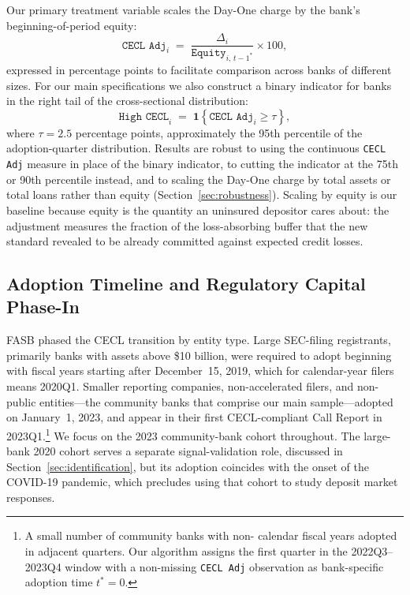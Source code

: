 Our primary treatment variable scales the Day-One charge by the bank's
beginning-of-period equity:
\begin{equation}
  \texttt{CECL Adj}_{i}
  \;=\;
  \frac{\Delta_i}{\texttt{Equity}_{i,\,t-1^{*}}}
  \times 100,
  \label{eq:treatment}
\end{equation}
expressed in percentage points to facilitate comparison across banks of
different sizes.  For our main specifications we also construct a binary
indicator for banks in the right tail of the cross-sectional distribution:
\begin{equation}
  \texttt{High CECL}_{i}
  \;=\;
  \mathbf{1}\!\left\{
    \texttt{CECL Adj}_{i} \geq \tau
  \right\},
  \label{eq:binary}
\end{equation}
where $\tau = 2.5$ percentage points, approximately the 95th percentile of the
adoption-quarter distribution.  Results are robust to using the continuous
\texttt{CECL Adj} measure in place of the binary indicator, to cutting the
indicator at the 75th or 90th percentile instead, and to scaling the Day-One
charge by total assets or total loans rather than equity
(Section~\ref{sec:robustness}).  Scaling by equity is our baseline because
equity is the quantity an uninsured depositor cares about: the adjustment
measures the fraction of the loss-absorbing buffer that the new standard
revealed to be already committed against expected credit losses.

\subsection{Adoption Timeline and Regulatory Capital Phase-In}
\label{sec:background:timeline}

FASB phased the CECL transition by entity type.  Large SEC-filing registrants,
primarily banks with assets above \$10 billion, were required to adopt
beginning with fiscal years starting after December~15, 2019, which for
calendar-year filers means 2020Q1.  Smaller reporting companies, non-accelerated
filers, and non-public entities---the community banks that comprise our main
sample---adopted on January~1, 2023, and appear in their first CECL-compliant
Call Report in 2023Q1.\footnote{A small number of community banks with non-
calendar fiscal years adopted in adjacent quarters.  Our algorithm assigns the
first quarter in the 2022Q3--2023Q4 window with a non-missing
\texttt{CECL Adj} observation as bank-specific adoption time $t^{*} = 0$.}
We focus on the 2023 community-bank cohort throughout.  The large-bank 2020
cohort serves a separate signal-validation role, discussed in
Section~\ref{sec:identification}, but its adoption coincides with the onset of
the COVID-19 pandemic, which precludes using that cohort to study deposit
market responses.

